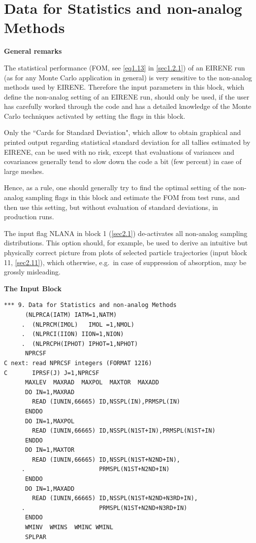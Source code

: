 \section{Data for Statistics and non-analog Methods} \label{sec2.9}

\textbf{General remarks} 

\medskip 

The statistical performance (\ac{FOM}, see \cref{eq1.13} in \cref{sec1.2.1}) of an EIRENE run (as for any Monte Carlo application in general) is very sensitive to the non-analog methods used by EIRENE.
Therefore the input parameters in this block, which define the non-analog setting of an EIRENE run, should only be used, if the user has carefully worked through the code and has a detailed knowledge of the Monte Carlo techniques activated by setting the flags in this block.

Only the ``Cards for Standard Deviation", which allow to obtain graphical and printed output regarding statistical standard deviation for all tallies estimated by EIRENE, can be used with no risk, except that evaluations of variances and covariances generally tend to slow down the code a bit (few percent) in case of large meshes.

Hence, as a rule, one should generally try to find the optimal setting of the non-analog sampling flags in this block and estimate the \ac{FOM} from test runs, and then use this setting, but without evaluation of standard deviations, in production runs.

The input flag NLANA in block 1 (\cref{sec2.1}) de-activates all non-analog sampling distributions.
This option should, for example, be used to derive an intuitive but physically correct picture from plots of selected particle trajectories (input block 11, \cref{sec2.11}), which otherwise, e.g.\ in case of suppression of absorption,  may be grossly misleading.

\medskip

\textbf{The Input Block} 

\begin{lstlisting}
*** 9. Data for Statistics and non-analog Methods
      (NLPRCA(IATM) IATM=1,NATM) 
     .  (NLPRCM(IMOL)   IMOL =1,NMOL)
     .  (NLPRCI(IION) IION=1,NION) 
     .  (NLPRCPH(IPHOT) IPHOT=1,NPHOT)
      NPRCSF
C next: read NPRCSF integers (FORMAT 12I6) 
C       IPRSF(J) J=1,NPRCSF
      MAXLEV  MAXRAD  MAXPOL  MAXTOR  MAXADD
      DO IN=1,MAXRAD
        READ (IUNIN,66665) ID,NSSPL(IN),PRMSPL(IN)
      ENDDO
      DO IN=1,MAXPOL
        READ (IUNIN,66665) ID,NSSPL(N1ST+IN),PRMSPL(N1ST+IN)
      ENDDO
      DO IN=1,MAXTOR
        READ (IUNIN,66665) ID,NSSPL(N1ST+N2ND+IN),
     .                     PRMSPL(N1ST+N2ND+IN)
      ENDDO
      DO IN=1,MAXADD
        READ (IUNIN,66665) ID,NSSPL(N1ST+N2ND+N3RD+IN),
     .                     PRMSPL(N1ST+N2ND+N3RD+IN)
      ENDDO
      WMINV  WMINS  WMINC WMINL
      SPLPAR
\end{lstlisting} 

